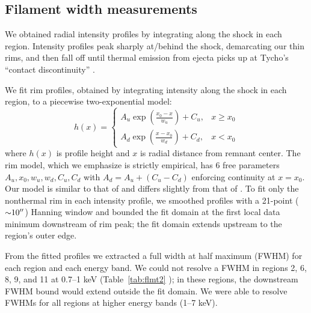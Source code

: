 \documentclass[iop, apj, numberedappendix, twocolappendix]{emulateapj}
\newcommand{\abt}{\mathord{\sim}} %
\begin{document}
\subsection{Filament width measurements}

We obtained radial intensity profiles by integrating along the shock in each
region.  Intensity profiles peak sharply at/behind the shock, demarcating our
thin rims, 
and then fall off until thermal emission from ejecta picks up at Tycho's
``contact discontinuity'' \citep{warren2005}.

We fit rim profiles, obtained by integrating intensity along the shock in each
region, to a piecewise two-exponential model:
\begin{equation} \label{eq:prof}
    h(x) =
    \begin{cases}
        A_u \exp \left(\frac{x_0 - x}{w_u}\right) + C_u, &x \geq x_0 \\
        A_d \exp \left(\frac{x - x_0}{w_d}\right) + C_d, &x < x_0
    \end{cases}
\end{equation}
where $h(x)$ is profile height and $x$ is radial distance from remnant center.
The rim model, which we emphasize is strictly empirical, has 6 free parameters
$A_u, x_0, w_u, w_d, C_u, C_d$ with $A_d = A_u + (C_u - C_d)$ enforcing
continuity at $x=x_0$. Our model is similar to that of \citet{bamba2003,
bamba2005-hist} and differs slightly from that of .
To fit only the nonthermal rim in each intensity profile, we smoothed profiles
with a 21-point ($\abt 10\arcsec$) Hanning window and bounded the fit
domain at the first local data minimum downstream of rim peak; the fit domain
extends upstream to the region's outer edge.

From the fitted profiles we extracted a full width at half maximum (FWHM) for
each region and each energy band.
We could not resolve a FWHM in regions 2, 6, 8, 9, and 11  at 0.7--1 keV (Table~\ref{tab:flmt2} ); in these regions, the downstream FWHM bound
would extend outside the fit domain.  We were able to resolve FWHMs for all
regions at higher energy bands (1--7 keV).
\end{document}
